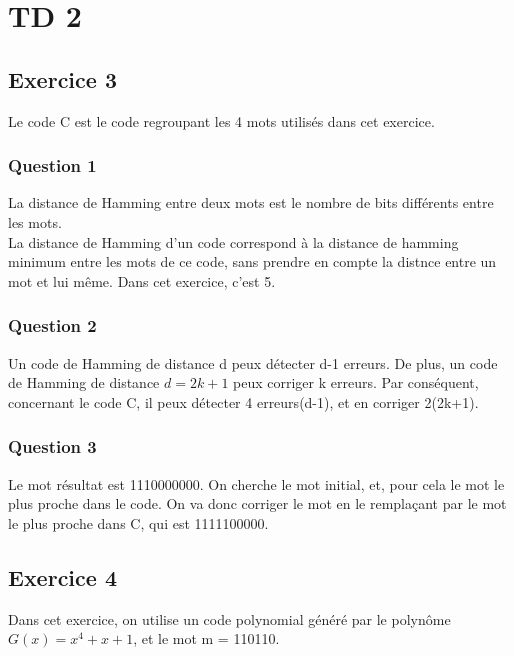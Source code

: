 \section{TD 2}
\subsection{Exercice 3}
Le code C est le code regroupant les 4 mots utilisés dans cet exercice.
\subsubsection{Question 1}
La distance de Hamming entre deux mots est le nombre de bits différents entre les mots.\\
La distance de Hamming d'un code correspond à la distance de hamming minimum entre les mots de ce code, sans prendre
en compte la distnce entre un mot et lui même. Dans cet exercice, c'est 5.
\subsubsection{Question 2}
Un code de Hamming de distance d peux détecter d-1 erreurs.
De plus, un code de Hamming de distance $d=2k+1$ peux corriger k erreurs.
Par conséquent, concernant le code C, il peux détecter 4 erreurs(d-1), et en corriger 2(2k+1).
\subsubsection{Question 3}
Le mot résultat est 1110000000. On cherche le mot initial, et, pour cela le mot le plus proche dans le code.
On va donc corriger le mot en le remplaçant par le mot le plus proche dans C, qui est  1111100000.

\subsection{Exercice 4}
Dans cet exercice, on utilise un code polynomial généré par le polynôme $G(x)=x^4+x+1$, et le mot m = 110110.\\

